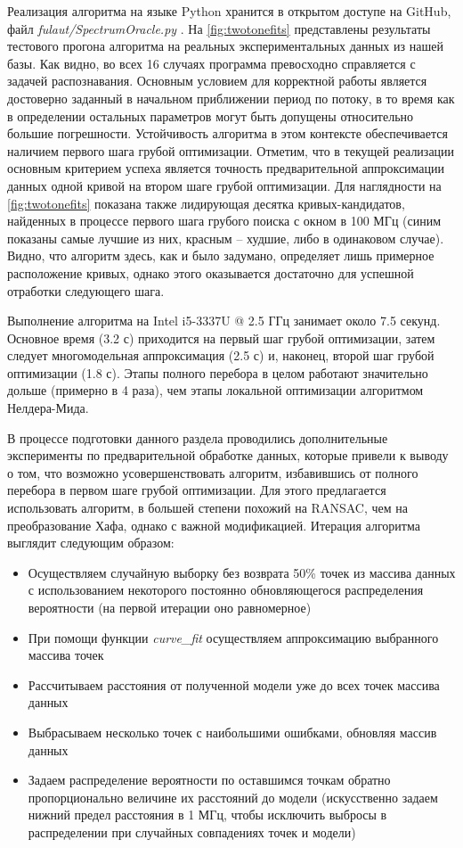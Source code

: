 \documentclass[14pt, a4paper]{extreport}
\numberwithin{equation}{section}
\begin{document}
Реализация алгоритма на языке Python хранится в открытом доступе на GitHub, файл \foreignlanguage{english}{\textit{fulaut/SpectrumOracle.py}} \cite{fedorov2021github}. На \autoref{fig:twotonefits} представлены результаты тестового прогона алгоритма на реальных экспериментальных данных из нашей базы. Как видно, во всех 16 случаях программа превосходно справляется с задачей распознавания. Основным условием для корректной работы является достоверно заданный в начальном приближении период по потоку, в то время как в определении остальных параметров могут быть допущены относительно большие погрешности. Устойчивость алгоритма в этом контексте обеспечивается наличием первого шага грубой оптимизации. Отметим, что в текущей реализации основным критерием успеха является точность предварительной аппроксимации данных одной кривой на втором шаге грубой оптимизации. Для наглядности на \autoref{fig:twotonefits} показана также лидирующая десятка кривых-кандидатов, найденных в процессе первого шага грубого поиска с окном в 100 МГц (синим показаны самые лучшие из них, красным -- худшие, либо в одинаковом случае). Видно, что алгоритм здесь, как и было задумано, определяет лишь примерное расположение кривых, однако этого оказывается достаточно для успешной отработки следующего шага.

Выполнение алгоритма на Intel i5-3337U @ 2.5 ГГц занимает около 7.5 секунд. Основное время (3.2 с) приходится на первый шаг грубой оптимизации, затем следует многомодельная аппроксимация (2.5 с) и, наконец, второй шаг грубой оптимизации (1.8 с). Этапы полного перебора в целом работают значительно дольше (примерно в 4 раза), чем этапы локальной оптимизации алгоритмом Нелдера-Мида.

В процессе подготовки данного раздела проводились дополнительные эксперименты по предварительной обработке данных, которые привели к выводу о том, что возможно усовершенствовать алгоритм, избавившись от полного перебора в первом шаге грубой оптимизации. Для этого предлагается использовать алгоритм, в большей степени похожий на RANSAC, чем на преобразование Хафа, однако с важной модификацией. Итерация алгоритма выглядит следующим образом:
\begin{itemize}
	\item Осуществляем случайную выборку без возврата 50\% точек из массива данных с использованием некоторого постоянно обновляющегося распределения вероятности (на первой итерации оно равномерное)
	\item При помощи функции \foreignlanguage{english}{\textit{curve\_fit}} осуществляем аппроксимацию выбранного массива точек
	\item Рассчитываем расстояния от полученной модели уже до всех точек массива данных
	\item Выбрасываем несколько точек с наибольшими ошибками, обновляя массив данных
	\item Задаем распределение вероятности по оставшимся точкам обратно пропорционально величине их расстояний до модели (искусственно задаем нижний предел расстояния в 1 МГц, чтобы исключить выбросы в распределении при случайных совпадениях точек и модели)
\end{itemize}
\end{document}
